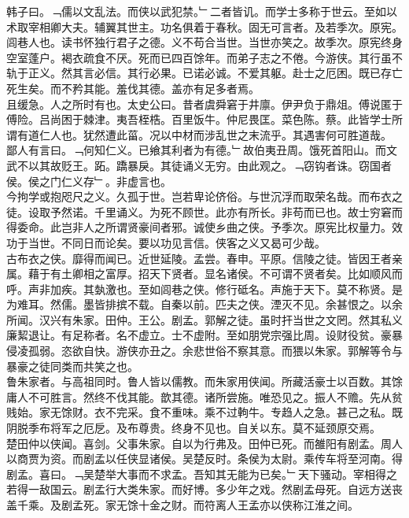 \documentclass{zhvt-classic}
\begin{document}

\hspace*{2em}韩子曰。﹁儒以文乱法。而侠以武犯禁。﹂二者皆讥。而学士多称于世云。至如以术取宰相卿大夫。辅翼其世主。功名俱着于春秋。固无可言者。及若季次。原宪。闾巷人也。读书怀独行君子之德。义不苟合当世。当世亦笑之。故季次。原宪终身空室蓬户。褐衣疏食不厌。死而已四百馀年。而弟子志之不倦。今游侠。其行虽不轨于正义。然其言必信。其行必果。已诺必诚。不爱其躯。赴士之厄困。既已存亡死生矣。而不矜其能。羞伐其德。盖亦有足多者焉。\\
\hspace*{2em}且缓急。人之所时有也。太史公曰。昔者虞舜窘于井廪。伊尹负于鼎俎。傅说匿于傅险。吕尚困于棘津。夷吾桎梏。百里饭牛。仲尼畏匡。菜色陈。蔡。此皆学士所谓有道仁人也。犹然遭此菑。况以中材而涉乱世之末流乎。其遇害何可胜道哉。\\
\hspace*{2em}鄙人有言曰。﹁何知仁义。已飨其利者为有德。﹂故伯夷丑周。饿死首阳山。而文武不以其故贬王。跖。蹻暴戾。其徒诵义无穷。由此观之。﹁窃钩者诛。窃国者侯。侯之门仁义存﹂。非虚言也。\\
\hspace*{2em}今拘学或抱咫尺之义。久孤于世。岂若卑论侪俗。与世沉浮而取荣名哉。而布衣之徒。设取予然诺。千里诵义。为死不顾世。此亦有所长。非苟而已也。故士穷窘而得委命。此岂非人之所谓贤豪间者邪。诚使乡曲之侠。予季次。原宪比权量力。效功于当世。不同日而论矣。要以功见言信。侠客之义又曷可少哉。\\
\hspace*{2em}古布衣之侠。靡得而闻已。近世延陵。孟尝。春申。平原。信陵之徒。皆因王者亲属。藉于有土卿相之富厚。招天下贤者。显名诸侯。不可谓不贤者矣。比如顺风而呼。声非加疾。其埶激也。至如闾巷之侠。修行砥名。声施于天下。莫不称贤。是为难耳。然儒。墨皆排摈不载。自秦以前。匹夫之侠。湮灭不见。余甚恨之。以余所闻。汉兴有朱家。田仲。王公。剧孟。郭解之徒。虽时扞当世之文罔。然其私义廉絜退让。有足称者。名不虚立。士不虚附。至如朋党宗强比周。设财役贫。豪暴侵凌孤弱。恣欲自快。游侠亦丑之。余悲世俗不察其意。而猥以朱家。郭解等令与暴豪之徒同类而共笑之也。\\
\hspace*{2em}鲁朱家者。与高祖同时。鲁人皆以儒教。而朱家用侠闻。所藏活豪士以百数。其馀庸人不可胜言。然终不伐其能。歆其德。诸所尝施。唯恐见之。振人不赡。先从贫贱始。家无馀财。衣不完采。食不重味。乘不过軥牛。专趋人之急。甚己之私。既阴脱季布将军之厄戹。及布尊贵。终身不见也。自关以东。莫不延颈原交焉。\\
\hspace*{2em}楚田仲以侠闻。喜剑。父事朱家。自以为行弗及。田仲已死。而雒阳有剧孟。周人以商贾为资。而剧孟以任侠显诸侯。吴楚反时。条侯为太尉。乘传车将至河南。得剧孟。喜曰。﹁吴楚举大事而不求孟。吾知其无能为已矣。﹂天下骚动。宰相得之若得一敌国云。剧孟行大类朱家。而好博。多少年之戏。然剧孟母死。自远方送丧盖千乘。及剧孟死。家无馀十金之财。而符离人王孟亦以侠称江淮之间。\\
\end{document}
